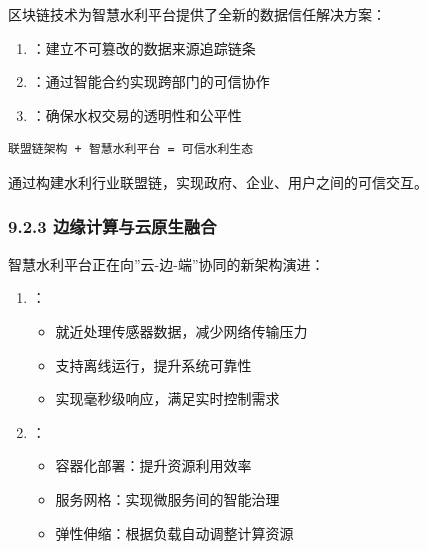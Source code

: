 
区块链技术为智慧水利平台提供了全新的数据信任解决方案：

\begin{enumerate}
\def\labelenumi{\arabic{enumi}.}
\tightlist
\item
  ：建立不可篡改的数据来源追踪链条
\item
  ：通过智能合约实现跨部门的可信协作
\item
  ：确保水权交易的透明性和公平性
\end{enumerate}


\begin{lstlisting}
联盟链架构 + 智慧水利平台 = 可信水利生态
\end{lstlisting}

通过构建水利行业联盟链，实现政府、企业、用户之间的可信交互。

\hypertarget{ux8fb9ux7f18ux8ba1ux7b97ux4e0eux4e91ux539fux751fux878dux5408}{%
\subsubsection{9.2.3 边缘计算与云原生融合}\label{ux8fb9ux7f18ux8ba1ux7b97ux4e0eux4e91ux539fux751fux878dux5408}}


智慧水利平台正在向''云-边-端''协同的新架构演进：

\begin{enumerate}
\def\labelenumi{\arabic{enumi}.}
\tightlist
\item
  ：

  \begin{itemize}
  \tightlist
  \item
    就近处理传感器数据，减少网络传输压力
  \item
    支持离线运行，提升系统可靠性
  \item
    实现毫秒级响应，满足实时控制需求
  \end{itemize}
\item
  ：

  \begin{itemize}
  \tightlist
  \item
    容器化部署：提升资源利用效率
  \item
    服务网格：实现微服务间的智能治理
  \item
    弹性伸缩：根据负载自动调整计算资源
  \end{itemize}
\end{enumerate}

